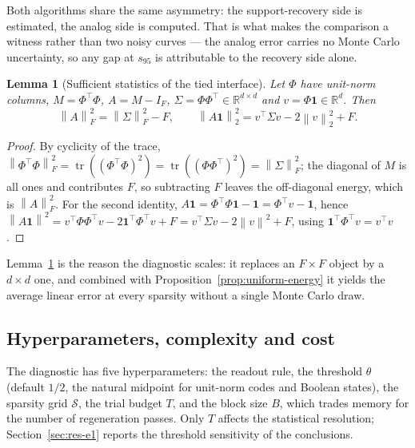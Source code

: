 \documentclass[preprint,12pt]{elsarticle}
\newtheorem{lemma}[theorem]{Lemma}
\theoremstyle{definition}
\newcommand{\R}{\mathbb{R}}
\newcommand{\norm}[1]{\left\lVert #1 \right\rVert}
\begin{document}
Both algorithms share the same asymmetry: the support-recovery side is estimated, the analog
side is computed. That is what makes the comparison a witness rather than two noisy curves ---
the analog error carries no Monte Carlo uncertainty, so any gap at $s_{95}$ is attributable to
the recovery side alone.

\begin{lemma}[Sufficient statistics of the tied interface]
\label{lem:moments}
Let $\Phi$ have unit-norm columns, $M=\Phi^{\top}\Phi$, $A=M-I_F$,
$\Sigma=\Phi\Phi^{\top}\in\R^{d\times d}$ and $v=\Phi\mathbf 1\in\R^d$. Then
\[
  \norm{A}_F^2=\norm{\Sigma}_F^2-F,
  \qquad
  \norm{A\mathbf 1}_2^2=v^{\top}\Sigma v-2\norm{v}_2^2+F .
\]
\end{lemma}

\begin{proof}
By cyclicity of the trace, $\norm{\Phi^{\top}\Phi}_F^2=\operatorname{tr}((\Phi^{\top}\Phi)^2)
=\operatorname{tr}((\Phi\Phi^{\top})^2)=\norm{\Sigma}_F^2$; the diagonal of $M$ is all ones and
contributes $F$, so subtracting $F$ leaves the off-diagonal energy, which is $\norm{A}_F^2$.
For the second identity, $A\mathbf 1=\Phi^{\top}\Phi\mathbf 1-\mathbf 1=\Phi^{\top}v-\mathbf 1$,
hence $\norm{A\mathbf 1}^2=v^{\top}\Phi\Phi^{\top}v-2\mathbf 1^{\top}\Phi^{\top}v+F
=v^{\top}\Sigma v-2\norm{v}^2+F$, using $\mathbf 1^{\top}\Phi^{\top}v=v^{\top}v$.
\end{proof}

Lemma~\ref{lem:moments} is the reason the diagnostic scales: it replaces an $F\times F$ object
by a $d\times d$ one, and combined with Proposition~\ref{prop:uniform-energy} it yields the
average linear error at every sparsity without a single Monte Carlo draw.

\subsection{Hyperparameters, complexity and cost}

The diagnostic has five hyperparameters: the readout rule, the threshold $\theta$ (default
$1/2$, the natural midpoint for unit-norm codes and Boolean states), the sparsity grid
$\mathcal S$, the trial budget $T$, and the block size $B$, which trades memory for the number
of regeneration passes. Only $T$ affects the statistical resolution;
Section~\ref{sec:res-e1} reports the threshold sensitivity of the conclusions.
\end{document}
